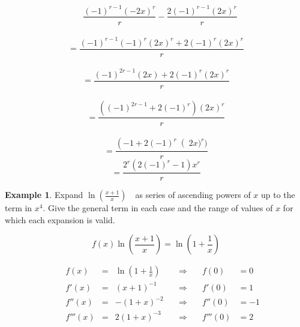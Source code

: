 \documentclass[12pt, a4paper]{report}
\theoremstyle{definition}
\newtheorem{example}{Example}
\begin{document}
	\begin{multicols}{2}
		\begin{center}
			$$	\quad\frac{(-1)^{r-1}(-2x)^r}{r} - \frac{2(-1)^{r-1}(2x)^r}{r}$$\\
			$$  =\frac{(-1)^{r-1}(-1)^r(2x)^r+2(-1)^r(2x)^r}{r}$$\\
			$$	=\frac{(-1)^{2r-1}(2x)+2(-1)^r(2x)^r}{r}$$\\
			$$	=\frac{\left( (-1)^{2r-1}+2(-1)^r\right) (2x)^r}{r}$$\\
			$$  =\frac{ \left(-1+2(-1)^r\right(2x)^r)}{r}$$
			$$ =\frac{2^r(2(-1)^r -1)x^r}{r}$$							
		\end{center}
	\end{multicols}
	
	\begin{example}
		Expand  $\ln\left(\frac{x+1}{x}\right)\quad$as series of ascending powers of $x$ up to the term in $x^4$. Give the general term in each case and the range of values of $x$ for which each expansion is valid.
	\end{example}
	
	$$f(x) \ln\left(\frac{x+1}{x}\right)  = \ln\left(1+\frac{1}{x}\right ) $$
	
	\begin{alignat*}{5}
		&   & f(x)    & = & \ln(1+\frac{1}{x})    \quad & \Rightarrow  \quad & f(0)    & = 0  \\
		&   & f'(x)   & = & (x+1)^{-1} \quad            & \Rightarrow  \quad & f'(0)   & = 1  \\
		&   & f''(x)  & = & -(1+x)^{-2}  \quad          & \Rightarrow \quad  & f''(0)  & = -1 \\
		&   & f'''(x) & = & 2(1+x)^{-3} \quad           & \Rightarrow  \quad & f'''(0) & = 2  
	\end{alignat*}
	
\end{document}
